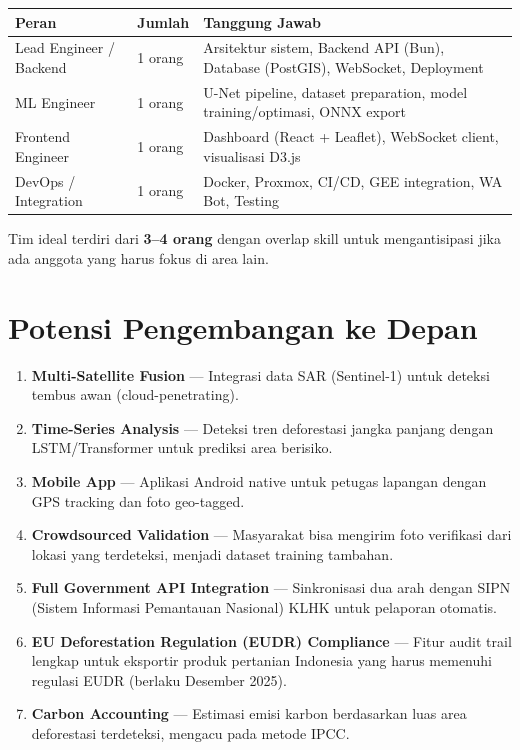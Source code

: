 \documentclass[11pt,a4paper]{article}
\begin{document}
\begin{longtable}{p{3.5cm} p{3cm} p{7cm}}
    \toprule
    \textbf{Peran} & \textbf{Jumlah} & \textbf{Tanggung Jawab} \\
    \midrule
    \endhead
    \bottomrule
    \endlastfoot

    Lead Engineer / Backend & 1 orang & Arsitektur sistem, Backend API (Bun), Database (PostGIS), WebSocket, Deployment \\

    ML Engineer & 1 orang & U-Net pipeline, dataset preparation, model training/optimasi, ONNX export \\

    Frontend Engineer & 1 orang & Dashboard (React + Leaflet), WebSocket client, visualisasi D3.js \\

    DevOps / Integration & 1 orang & Docker, Proxmox, CI/CD, GEE integration, WA Bot, Testing \\

    \end{longtable}

Tim ideal terdiri dari \textbf{3--4 orang} dengan overlap skill untuk mengantisipasi jika ada anggota yang harus fokus di area lain.

\section{Potensi Pengembangan ke Depan}

\begin{enumerate}
    \item \textbf{Multi-Satellite Fusion} --- Integrasi data SAR (Sentinel-1) untuk deteksi tembus awan (cloud-penetrating).
    \item \textbf{Time-Series Analysis} --- Deteksi tren deforestasi jangka panjang dengan LSTM/Transformer untuk prediksi area berisiko.
    \item \textbf{Mobile App} --- Aplikasi Android native untuk petugas lapangan dengan GPS tracking dan foto geo-tagged.
    \item \textbf{Crowdsourced Validation} --- Masyarakat bisa mengirim foto verifikasi dari lokasi yang terdeteksi, menjadi dataset training tambahan.
    \item \textbf{Full Government API Integration} --- Sinkronisasi dua arah dengan SIPN (Sistem Informasi Pemantauan Nasional) KLHK untuk pelaporan otomatis.
    \item \textbf{EU Deforestation Regulation (EUDR) Compliance} --- Fitur audit trail lengkap untuk eksportir produk pertanian Indonesia yang harus memenuhi regulasi EUDR (berlaku Desember 2025).
    \item \textbf{Carbon Accounting} --- Estimasi emisi karbon berdasarkan luas area deforestasi terdeteksi, mengacu pada metode IPCC.
\end{enumerate}
\end{document}
